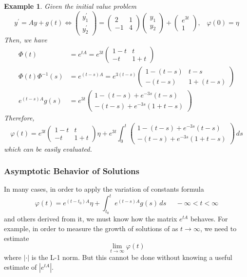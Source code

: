 \documentclass{article}
\newtheorem{example}{Example}[section]
\theoremstyle{remark}
\theoremstyle{definition}
\begin{document}
    \begin{example}
    Given the initial value problem 
    \[y^\prime = Ay + g(t) \iff \begin{pmatrix} y_1 ^\prime \\ y_2^\prime \end{pmatrix} = \begin{pmatrix} 2 & 1 \\ -1 & 4 \end{pmatrix} \begin{pmatrix} y_1 \\ y_2 \end{pmatrix} + \begin{pmatrix} e^{3t} \\ 1 \end{pmatrix}, \;\;\; \varphi(0) = \eta\]
    Then, we have
    \begin{align*}
        \Phi(t) & = e^{tA} = e^{3t} \begin{pmatrix} 1-t & t \\ -t & 1+t \end{pmatrix} \\
        \Phi(t) \Phi^{-1} (s) & = e^{(t-s)A} = e^{3(t-s)} \begin{pmatrix} 1 - (t-s) & t-s \\ -(t-s) & 1+(t-s) \end{pmatrix} \\
        e^{(t-s)A} g(s) & = e^{3t} \begin{pmatrix}
        1-(t-s)+e^{-3s}(t-s) \\ -(t-s) + e^{-3s} (1+t-s)\end{pmatrix}
    \end{align*}
    Therefore, 
    \[\varphi(t) = e^{3t} \begin{pmatrix} 1-t & t \\ -t & 1+t \end{pmatrix} \eta + e^{3t} \int_{0}^t \begin{pmatrix} 1-(t-s) + e^{-3s} (t-s) \\
    -(t-s) + e^{-3s}(1+t-s) \end{pmatrix} \,ds\]
    which can be easily evaluated. 
    \end{example}

    \subsubsection{Asymptotic Behavior of Solutions}

      In many cases, in order to apply the variation of constants formula 
      \[\varphi(t) = e^{(t - t_0)A} \eta + \int_{t_0}^t e^{(t-s)A} g(s) \,ds \;\;\;\;\; -\infty < t< \infty\]
      and others derived from it, we must know how the matrix $e^{tA}$ behaves. For example, in order to measure the growth of solutions of as $t \rightarrow \infty$, we need to estimate 
      \[\lim_{t\rightarrow \infty} \varphi(t)\]
      where $|\cdot|$ is the L-1 norm. But this cannot be done without knowing a useful estimate of $|e^{tA}|$. 
\end{document}
